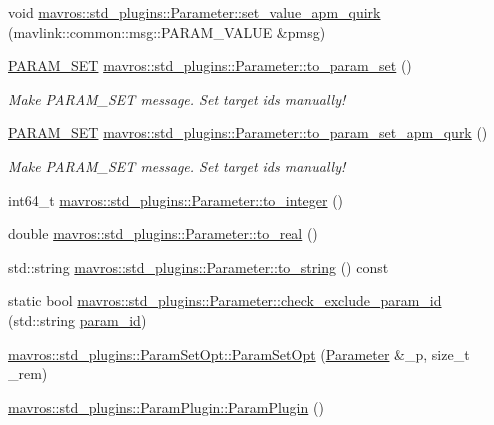 \begin{DoxyCompactItemize}
void \mbox{\hyperlink{group__plugin_ga3dbec960ba82630bd31abb9dcca666c8}{mavros\+::std\+\_\+plugins\+::\+Parameter\+::set\+\_\+value\+\_\+apm\+\_\+quirk}} (mavlink\+::common\+::msg\+::\+P\+A\+R\+A\+M\+\_\+\+V\+A\+L\+UE \&pmsg)
\item 
\mbox{\hyperlink{group__plugin_gaa94f933e0249802ee1985cb650408c31}{P\+A\+R\+A\+M\+\_\+\+S\+ET}} \mbox{\hyperlink{group__plugin_ga4b2fdb771fa5acf1f2ec5224636f603f}{mavros\+::std\+\_\+plugins\+::\+Parameter\+::to\+\_\+param\+\_\+set}} ()
\begin{DoxyCompactList}\small\item\em Make P\+A\+R\+A\+M\+\_\+\+S\+ET message. Set target ids manually! \end{DoxyCompactList}\item 
\mbox{\hyperlink{group__plugin_gaa94f933e0249802ee1985cb650408c31}{P\+A\+R\+A\+M\+\_\+\+S\+ET}} \mbox{\hyperlink{group__plugin_gac1ad9cfef5618f54cf828438bb98cb03}{mavros\+::std\+\_\+plugins\+::\+Parameter\+::to\+\_\+param\+\_\+set\+\_\+apm\+\_\+qurk}} ()
\begin{DoxyCompactList}\small\item\em Make P\+A\+R\+A\+M\+\_\+\+S\+ET message. Set target ids manually! \end{DoxyCompactList}\item 
int64\+\_\+t \mbox{\hyperlink{group__plugin_gae72d53f3c84fe6c018f95d55510f78b8}{mavros\+::std\+\_\+plugins\+::\+Parameter\+::to\+\_\+integer}} ()
\item 
double \mbox{\hyperlink{group__plugin_ga687f8cff04b669b9d15aacd19ec0af23}{mavros\+::std\+\_\+plugins\+::\+Parameter\+::to\+\_\+real}} ()
\item 
std\+::string \mbox{\hyperlink{group__plugin_ga37cec503b8ebce4ccf83c34b3cc1a5c3}{mavros\+::std\+\_\+plugins\+::\+Parameter\+::to\+\_\+string}} () const
\item 
static bool \mbox{\hyperlink{group__plugin_ga90b347f43583c077d87ec34b7bfb7164}{mavros\+::std\+\_\+plugins\+::\+Parameter\+::check\+\_\+exclude\+\_\+param\+\_\+id}} (std\+::string \mbox{\hyperlink{group__plugin_ga6e9b1d000a31b2ca2773ff03c28980da}{param\+\_\+id}})
\item 
\mbox{\hyperlink{group__plugin_ga5fde2c30705fd08fa9eeee30a882633a}{mavros\+::std\+\_\+plugins\+::\+Param\+Set\+Opt\+::\+Param\+Set\+Opt}} (\mbox{\hyperlink{classmavros_1_1std__plugins_1_1Parameter}{Parameter}} \&\+\_\+p, size\+\_\+t \+\_\+rem)
\item 
\mbox{\hyperlink{group__plugin_ga7c2bfbe1cd5b72b7685ad0b875e935db}{mavros\+::std\+\_\+plugins\+::\+Param\+Plugin\+::\+Param\+Plugin}} ()

\end{DoxyCompactItemize}
